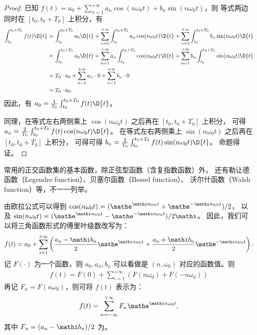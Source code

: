 \begin{proof}
    已知 $f(t) = a_0 + \sum_{n = 1}^{+\infty}a_n\cos(n\omega_0 t) + b_n\sin(n\omega_0 t)$，则
    等式两边同时在 $[t_0, t_0 + T_0]$ 上积分，有
    \begin{align*}
        \int_{t_0}^{t_0 + T_0}f(t)\D{t} & = \int_{t_0}^{t_0 + T_0}a_0\D{t} + \sum_{n = 1}^{+\infty}\int_{t_0}^{t_0 + T_0}a_n\cos(n\omega_0 t)\D{t} + \sum_{n = 1}^{+\infty}\int_{t_0}^{t_0 + T_0}b_n\sin(n\omega_0 t)\D{t} \\
        & = \int_{t_0}^{t_0 + T_0}a_0\D{t} + \sum_{n = 1}^{+\infty}a_n\int_{t_0}^{t_0 + T_0}\cos(n\omega_0 t)\D{t} + \sum_{n = 1}^{+\infty}b_n\int_{t_0}^{t_0 + T_0}\sin(n\omega_0 t)\D{t} \\
        & = T_0 \cdot a_0 + \sum_{n = 1}^{+\infty}a_n\cdot 0 + \sum_{n = 1}^{+\infty}b_n\cdot 0 \\
        & = T_0 \cdot a_0.
    \end{align*}
    因此，有 $a_0 = \frac{1}{T_0}\int_{t_0}^{t_0 + T_0}f(t)\D{t}$。

    同理，在等式左右两侧乘上 $\cos(n \omega_0 t)$ 之后再在 $[t_0, t_0 + T_0]$ 上积分，
    可得 $a_n = \frac{2}{T_0}\int_{t_0}^{t_0 + T_0}f(t)\cos(n\omega_0 t)\D{t}$。
    在等式左右两侧乘上 $\sin(n \omega_0 t)$ 之后再在 $[t_0, t_0 + T_0]$ 上积分，
    可得可得 $b_n = \frac{2}{T_0}\int_{t_0}^{t_0 + T_0}f(t)\sin(n\omega_0 t)\D{t}$。
    命题得证。
\end{proof}

\begin{remark}
    常用的正交函数集的基本函数，除正弦型函数（含复指数函数）外，
    还有勒让德函数（Legendre function）、贝塞尔函数（Bessel function）、
    沃尔什函数（Walsh function）等，不一一列举。
\end{remark}

\begin{definition}[复指数形式傅里叶级数]
    由欧拉公式可以得到 $\cos(n\omega_0 t) = (\mathe^{\mathi n\omega_0 t} + \mathe^{-\mathi n\omega_0 t}) / 2$，
    以及 $\sin(n\omega_0 t) = (\mathe^{\mathi n\omega_0 t} - \mathe^{-\mathi n\omega_0 t}) / 2\mathi$。
    因此，我们可以将三角函数形式的傅里叶级数改写为：
    \begin{align*}
        f(t) = a_0 + \sum_{i = 1}^{+\infty}\left(\frac{a_n - \mathi b_n}{2}\mathe^{\mathi n\omega_0 t} + \frac{a_n + \mathi b_n}{2}\mathe^{-\mathi n\omega_0 t}\right).
    \end{align*}
    记 $F(\cdot)$ 为一个函数，则 $a_0, a_n, b_n$ 可以看做是 $(n, \omega_0)$ 对应的函数值。则
    \begin{align*}
        f(t) = F(0) + \sum_{i = 1}^{+\infty}\left(F(n\omega_0)+ F(-n\omega_0)\right)
    \end{align*}
    再记 $F_n = F(n\omega_0)$，则可将 $f(t)$ 表示为：
    \begin{align*}
        f(t) = \sum_{n = -\infty}^{+\infty}F_n\mathe^{\mathi n\omega_0 t},
    \end{align*}
    其中 $F_n = (a_n - \mathi b_n) / 2$ 为。
\end{definition}

